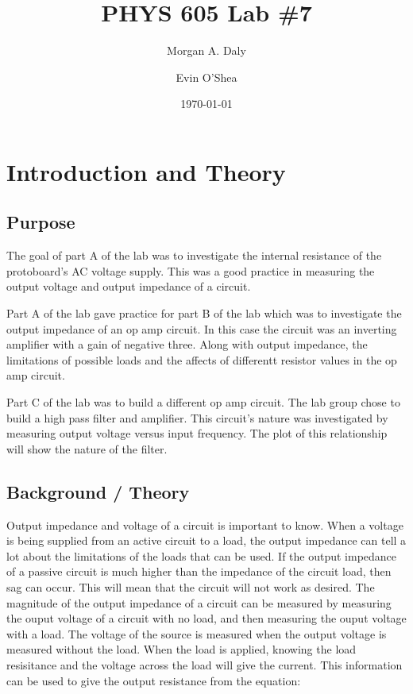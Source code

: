 \documentclass[twocolumn, amsmath]{revtex4}
\begin{document}
\title{PHYS 605 Lab \#7} 

\author{Morgan A. Daly}
\author{Evin O'Shea}
\date{\today} 


\maketitle


\section{Introduction and Theory}
\subsection{Purpose}

The goal of part A of the lab was to investigate the internal resistance of the protoboard's AC voltage supply. This was a good practice in measuring the output voltage and output impedance of a circuit. 

Part A of the lab gave practice for part B of the lab which was to investigate the output impedance of an op amp circuit. In this case the circuit was an inverting amplifier with a gain of negative three. Along with output impedance, the limitations of possible loads and the affects of differentt resistor values in the op amp circuit.

Part C of the lab was to build a different op amp circuit. The lab group chose to build a high pass filter and amplifier. This circuit's nature was investigated by measuring output voltage versus input frequency. The plot of this relationship will show the nature of the filter.

\subsection{Background / Theory}

Output impedance and voltage of a circuit is important to know. When a voltage is being supplied from an active circuit to a load, the output impedance can tell a lot about the limitations of the loads that can be used. If the output impedance of a passive circuit is much higher than the impedance of the circuit load, then sag can occur. This will mean that the circuit will not work as desired. The magnitude of the output impedance of a circuit can be measured by measuring the ouput voltage of a circuit with no load, and then measuring the ouput voltage with a load. The voltage of the source is measured when the output voltage is measured without the load. When the load is applied, knowing the load resisitance and the voltage across the load will give the current. This information can be used to give the output resistance from the equation:
\end{document}
